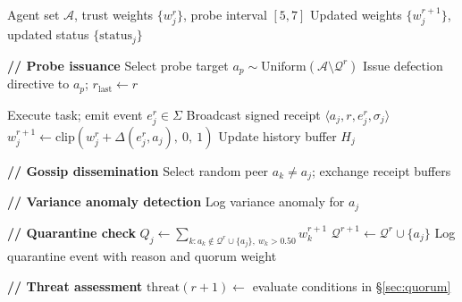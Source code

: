 \begin{algorithm}
\caption{Trust Quorum Protocol — per-round execution for agent $a_i$}
\label{alg:protocol}
\begin{algorithmic}[1]
\Require Agent set $\mathcal{A}$, trust weights $\{w_j^r\}$, probe interval $[5, 7]$
\Ensure Updated weights $\{w_j^{r+1}\}$, updated status $\{\text{status}_j\}$

\State \textbf{// Probe issuance}
  \State Select probe target $a_p \sim \text{Uniform}(\mathcal{A} \setminus \mathcal{Q}^r)$
  \State Issue defection directive to $a_p$; $r_\text{last} \leftarrow r$
\EndIf

  \State Execute task; emit event $e_j^r \in \Sigma$
  \State Broadcast signed receipt $\langle a_j, r, e_j^r, \sigma_j \rangle$
  \State $w_j^{r+1} \leftarrow \mathrm{clip}(w_j^r + \Delta(e_j^r, a_j),\ 0,\ 1)$
  \State Update history buffer $H_j$
\EndFor

\State \textbf{// Gossip dissemination}
  \State Select random peer $a_k \neq a_j$; exchange receipt buffers
\EndFor

\State \textbf{// Variance anomaly detection}
    \State Log variance anomaly for $a_j$ 
  \EndIf
\EndFor

\State \textbf{// Quarantine check}
  \State $Q_j \leftarrow \sum_{k : a_k \notin \mathcal{Q}^r \cup \{a_j\},\ w_k > 0.50} w_k^{r+1}$
    \State $\mathcal{Q}^{r+1} \leftarrow \mathcal{Q}^r \cup \{a_j\}$
    \State Log quarantine event with reason and quorum weight
  \EndIf
\EndFor

\State \textbf{// Threat assessment}
\State $\text{threat}(r+1) \leftarrow$ evaluate conditions in \S\ref{sec:quorum}
\end{algorithmic}
\end{algorithm}
%

